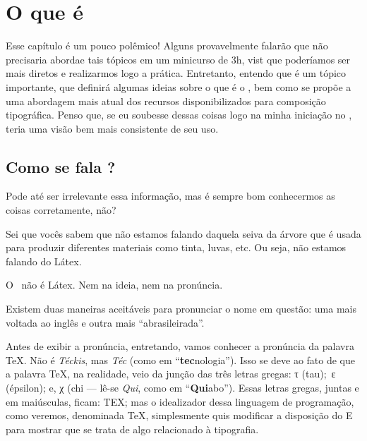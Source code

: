 \chapter{O que é \LaTeXX} 
\label{cap:LaTeX}

Esse capítulo é um pouco polêmico!
Alguns provavelmente falarão que não precisaria abordae tais tópicos em um 
minicurso de 3\unit{h}, vist que poderíamos ser mais diretos e realizarmos 
logo a prática. 
Entretanto, entendo que é um tópico importante, que definirá algumas ideias 
sobre o que é o \LaTeXX, bem como se propõe a uma abordagem mais atual dos 
recursos disponibilizados para composição tipográfica. 
Penso que, se eu soubesse dessas coisas logo na minha iniciação no \LaTeXX, 
teria uma visão bem mais consistente de seu uso. 


\section{Como se fala \LaTeXX?}
\label{sec:como-se-fala}

Pode até ser irrelevante essa informação, mas é sempre bom conhecermos as 
coisas corretamente, não? 

Sei que vocês sabem que não estamos falando daquela seiva da árvore que é 
usada para produzir diferentes materiais como tinta, luvas, etc. 
Ou seja, não estamos falando do Látex. 

O \LaTeXX\ não é Látex. 
Nem na ideia, nem na pronúncia. 

Existem duas maneiras aceitáveis para pronunciar o nome em questão: uma mais
voltada ao inglês e outra mais ``abrasileirada''. 

Antes de exibir a pronúncia, entretando, vamos conhecer a pronúncia da 
palavra \TeX.
Não é \textit{Téckis}, mas \textit{Téc} (como em ``\textbf{tec}nologia''). 
Isso se deve ao fato de que a palavra \TeX, na realidade, veio da junção 
das três letras gregas: {\grega τ} (tau);\, {\grega ε} (épsilon); e, 
{\grega χ} (chi --- lê-se \textit{Qui}, como em ``\textbf{Qui}abo'').
Essas letras gregas, juntas e em maiúsculas, ficam: {\grega ΤΕΧ}; mas o 
idealizador dessa linguagem de programação, como veremos, denominada \TeX, 
simplesmente quis modificar a disposição do {\grega Ε} para mostrar que se 
trata de algo relacionado à tipografia.

